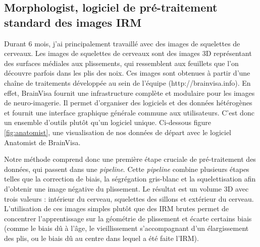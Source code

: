 \documentclass[12pt, oneside, a4paper, titlepage]{article}
\begin{document}
\subsection{Morphologist, logiciel de pré-traitement standard des images IRM}

Durant 6 mois, j'ai principalement travaillé avec des images de squelettes de cerveaux. Les images de squelettes de cerveaux sont des images 3D représentant des surfaces médiales aux plissements, qui ressemblent aux feuillets que l’on découvre parfois dans les plis des noix. Ces images   sont   obtenues   à   partir   d’une   chaîne   de   traitements   développée   au   sein   de   l’équipe (http://brainvisa.info). En effet, BrainVisa fournit une infrastructure complète et modulaire pour les images de neuro-imagerie. Il permet d'organiser des logiciels et des données hétérogènes et fournit une interface graphique générale commune aux utilisateurs. C'est donc un ensemble d'outils plutôt qu'un logiciel unique. Ci-dessous figure \ref{fig:anatomist}, une visualisation de nos données de départ avec le logiciel Anatomist de BrainVisa.

Notre méthode comprend donc une première étape cruciale de pré-traitement des données, qui passent dans une \textit{pipeline}. Cette \textit{pipeline} combine plusieurs étapes telles que la correction de biais, la ségrégation gris-blanc et la squelettisation afin d'obtenir une image négative du plissement. Le résultat est un volume 3D avec trois valeurs : intérieur du cerveau, squelettes des sillons et extérieur du cerveau. L'utilisation de ces images simples plutôt que des IRM brutes permet de concentrer l'apprentissage sur la géométrie de plissement et écarte certains biais (comme le biais dû à l'âge, le vieillissement s'accompagnant d'un élargissement des plis, ou le biais dû au centre dans lequel a été faite l'IRM). \\
\end{document}
